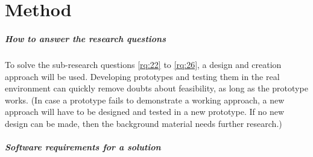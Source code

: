 \chapter{Method}

\paragraph*{How to answer the research questions}
To solve the sub-research questions \cref{rq:22} to \cref{rq:26}, a design and creation approach will be used.
Developing prototypes and testing them in the real environment can quickly remove doubts about feasibility, as long as the prototype works.
(In case a prototype fails to demonstrate a working approach, a new approach will have to be designed and tested in a new prototype.
If no new design can be made, then the background material needs further research.)

\paragraph*{Software requirements for a solution}







